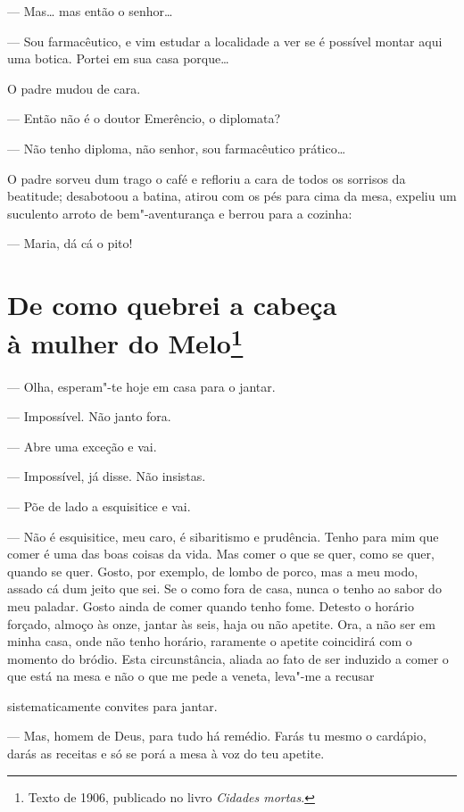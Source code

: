 --- Mas\ldots{} mas então o senhor\ldots{}

--- Sou farmacêutico, e vim estudar a localidade a ver se é possível
montar aqui uma botica. Portei em sua casa porque\ldots{}

O padre mudou de cara.

--- Então não é o doutor Emerêncio, o diplomata?

--- Não tenho diploma, não senhor, sou farmacêutico prático\ldots{}

O padre sorveu dum trago o café e refloriu a cara de todos os sorrisos
da beatitude; desabotoou a batina, atirou com os pés para cima da mesa,
expeliu um suculento arroto de bem"-aventurança e berrou para a cozinha:

--- Maria, dá cá o pito!

\chapter[De como quebrei a cabeça à mulher do Melo]{De como quebrei a cabeça\\ à mulher do Melo\footnote[*]{Texto de 1906, publicado no livro \emph{Cidades mortas}.}}

--- Olha, esperam"-te hoje em casa para o jantar.

--- Impossível. Não janto fora.

--- Abre uma exceção e vai.

--- Impossível, já disse. Não insistas.

--- Põe de lado a esquisitice e vai.

--- Não é esquisitice, meu caro, é sibaritismo e prudência. Tenho para
mim que comer é uma das boas coisas da vida. Mas comer o que se quer,
como se quer, quando se quer. Gosto, por exemplo, de lombo de porco, mas
a meu modo, assado cá dum jeito que sei. Se o como fora de casa, nunca o
tenho ao sabor do meu paladar. Gosto ainda de comer quando tenho fome.
Detesto o horário forçado, almoço às onze, jantar às seis, haja ou não
apetite. Ora, a não ser em minha casa, onde não tenho horário, raramente
o apetite coincidirá com o momento do bródio. Esta circunstância, aliada
ao fato de ser induzido a comer o que está na mesa e não o que me pede a
veneta, leva"-me a recusar

sistematicamente convites para jantar.

--- Mas, homem de Deus, para tudo há remédio. Farás tu mesmo o cardápio,
darás as receitas e só se porá a mesa à voz do teu apetite.

